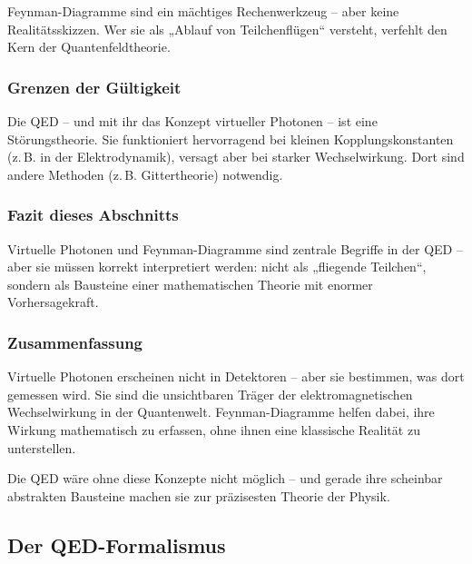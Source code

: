 \vspace{0.5em}
\begin{tcolorbox}[warnbox, title=Warnung: Feynman-Diagramme nicht wörtlich nehmen!]
	\label{box:Warnung}
	Feynman-Diagramme sind ein mächtiges Rechenwerkzeug – aber keine Realitätsskizzen. Wer sie als „Ablauf von Teilchenflügen“ versteht, verfehlt den Kern der Quantenfeldtheorie.
\end{tcolorbox}

\subsubsection*{Grenzen der Gültigkeit}
Die QED – und mit ihr das Konzept virtueller Photonen – ist eine Störungstheorie. Sie funktioniert hervorragend bei kleinen Kopplungskonstanten (z.\,B. in der Elektrodynamik), versagt aber bei starker Wechselwirkung. Dort sind andere Methoden (z.\,B. Gittertheorie) notwendig.

\subsubsection*{Fazit dieses Abschnitts}
Virtuelle Photonen und Feynman-Diagramme sind zentrale Begriffe in der QED – aber sie müssen korrekt interpretiert werden: nicht als „fliegende Teilchen“, sondern als Bausteine einer mathematischen Theorie mit enormer Vorhersagekraft.

\subsubsection{Zusammenfassung}

Virtuelle Photonen erscheinen nicht in Detektoren – aber sie bestimmen, was dort gemessen wird. Sie sind die unsichtbaren Träger der elektromagnetischen Wechselwirkung in der Quantenwelt. Feynman-Diagramme helfen dabei, ihre Wirkung mathematisch zu erfassen, ohne ihnen eine klassische Realität zu unterstellen.

Die QED wäre ohne diese Konzepte nicht möglich – und gerade ihre scheinbar abstrakten Bausteine machen sie zur präzisesten Theorie der Physik.

\subsection{Der QED-Formalismus}

